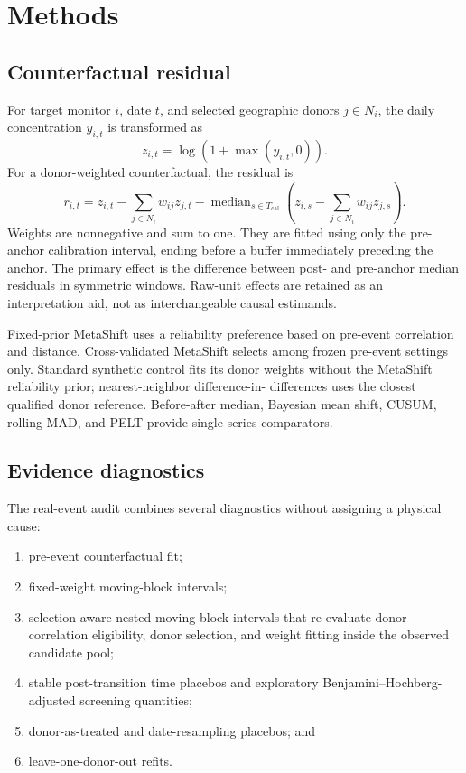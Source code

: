\section{Methods}

\subsection{Counterfactual residual}

For target monitor $i$, date $t$, and selected geographic donors $j \in N_i$,
the daily concentration $y_{i,t}$ is transformed as
\[
z_{i,t} = \log(1 + \max(y_{i,t}, 0)).
\]
For a donor-weighted counterfactual, the residual is
\[
r_{i,t} = z_{i,t} - \sum_{j \in N_i} w_{ij}z_{j,t}
- \operatorname{median}_{s \in T_{\mathrm{cal}}}
\left(z_{i,s} - \sum_{j \in N_i}w_{ij}z_{j,s}\right).
\]
Weights are nonnegative and sum to one. They are fitted using only the
pre-anchor calibration interval, ending before a buffer immediately preceding
the anchor. The primary effect is the difference between post- and pre-anchor
median residuals in symmetric windows. Raw-unit effects are retained as an
interpretation aid, not as interchangeable causal estimands.

Fixed-prior MetaShift uses a reliability preference based on pre-event
correlation and distance. Cross-validated MetaShift selects among frozen
pre-event settings only. Standard synthetic control fits its donor weights
without the MetaShift reliability prior; nearest-neighbor difference-in-
differences uses the closest qualified donor reference. Before-after median,
Bayesian mean shift, CUSUM, rolling-MAD, and PELT provide single-series
comparators.

\subsection{Evidence diagnostics}

The real-event audit combines several diagnostics without assigning a physical
cause:
\begin{enumerate}
  \item pre-event counterfactual fit;
  \item fixed-weight moving-block intervals;
  \item selection-aware nested moving-block intervals that re-evaluate donor
  correlation eligibility, donor selection, and weight fitting inside the
  observed candidate pool;
  \item stable post-transition time placebos and exploratory
  Benjamini--Hochberg-adjusted screening quantities;
  \item donor-as-treated and date-resampling placebos; and
  \item leave-one-donor-out refits.
\end{enumerate}

